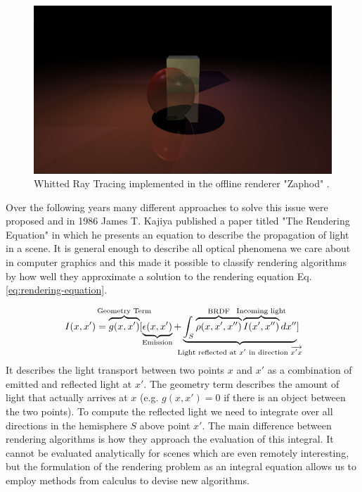 \documentclass{ACGSeminar}
\begin{document}
\begin{figure}[htb!]
  \begin{centering}
    \includegraphics[width=12cm,natwidth=1280,natheight=720]{figures/whitted_raytracing.png}\par
  \end{centering}
  \caption{Whitted Ray Tracing implemented in the offline renderer "Zaphod" \cite{Zaphod}.}
  \label{fig:whitted-example}
\end{figure}


Over the following years many different approaches to solve this issue were proposed and in 1986 James T. Kajiya published a paper titled "The Rendering Equation"  \cite{Kajiya:1986} in which he presents an equation to describe the propagation of light in a scene. It is general enough to describe all optical phenomena we care about in computer graphics and this made it possible to classify rendering algorithms by how well they approximate a solution to the rendering equation Eq. \eqref{eq:rendering-equation}.

\begin{equation} \label{eq:rendering-equation}
I(x,x')= \overbrace{g(x,x')}^{\mathclap{\text{Geometry Term}}}
         [
         \underbrace{\epsilon(x,x')}_{\mathclap{\text{Emission}}}
         + \underbrace{
         \int_{S}{\overbrace{\rho(x,x',x'')}^{\mathclap{\text{BRDF}}}
                  \overbrace{I(x',x'') }^{\mathclap{\text{Incoming light}}} dx''}
         }_{\mathclap{\text{Light reflected at $x'$ in direction $\overrightarrow{x'x}$}}} ]
\end{equation}
It describes the light transport between two points $x$ and $x'$ as a combination of emitted and reflected light at $x'$. The geometry term describes the amount of light that actually arrives at $x$ (e.g. $g(x,x') = 0$ if there is an object between the two points). To compute the reflected light we need to integrate over all directions in the hemisphere $S$ above point $x'$. 
The main difference between rendering algorithms is how they approach the evaluation of this integral. It cannot be evaluated analytically for scenes which are even remotely interesting, but the formulation of the rendering problem as an integral equation allows us to employ methods from calculus to devise new algorithms.
\end{document}
